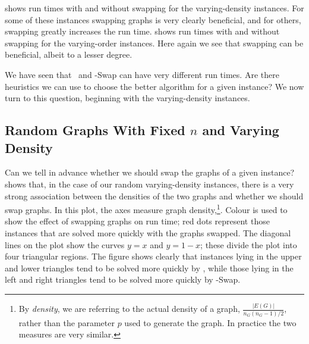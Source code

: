  shows run times with and without swapping
for the varying-density instances.
For some of these instances swapping graphs is very clearly beneficial, and for others,
swapping greatly increases the run time.
 shows run times with and without swapping
for the varying-order instances.  Here again we see that swapping can be beneficial,
albeit to a lesser degree.

We have seen that \McSplit\ and
\McSplit-Swap can have very different run times.  Are there heuristics we can
use to choose the better algorithm for a given instance? We now turn to this
question, beginning with the varying-density instances.

\subsection{Random Graphs With Fixed $n$ and Varying Density}

Can we tell in advance whether we should swap the graphs of a given instance?
 shows that, in the case of our
random varying-density instances, there is a very strong association between the densities
of the two graphs and whether we should swap graphs.  In this plot, the axes
measure graph density,\footnote{By \emph{density}, we are referring to the actual density of a graph,
$\frac{|E(G)|}{n_G(n_G-1)/2}$, rather than the parameter $p$ used to generate
the graph. In practice the two measures are very similar.}. Colour is used to show
the effect of swapping graphs on run time; red dots represent those instances
that are solved more quickly with the graphs swapped.  The diagonal lines on the plot
show the curves $y=x$ and $y=1-x$; these divide the plot into four triangular regions.
The figure shows clearly that instances lying
in the upper and lower triangles tend to be solved more quickly by \McSplit, while
those lying in the left and right triangles tend to be solved more
quickly by \McSplit-Swap.

